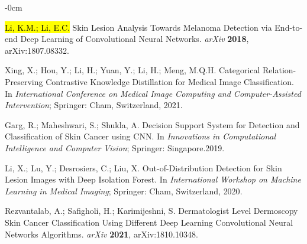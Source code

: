 \documentclass[sensors,article,accept,pdftex,moreauthors]{Definitions/mdpi}
\begin{document}
\begin{adjustwidth}{-\extralength}{0cm}




%

\begin{thebibliography}{999}

\hl{Li, K.M.; Li, E.C.} %
 Skin Lesion Analysis Towards Melanoma Detection via End-to-end Deep Learning of Convolutional Neural Networks. 
{\em arXiv } 
{\bf{2018}}, arXiv:1807.08332.

Xing, X.; Hou, Y.; Li, H.; Yuan, Y.; Li, H.; Meng, M.Q.H.
  Categorical Relation-Preserving Contrastive Knowledge Distillation for Medical Image Classification. 
In  \emph{International Conference on Medical Image Computing and Computer-Assisted Intervention}; Springer: Cham, Switzerland, 
{2021}.

Garg, R.; Maheshwari, S.; Shukla, A. Decision Support System for Detection and Classification of Skin Cancer using CNN. In \emph{Innovations in Computational Intelligence and Computer Vision}; Springer: Singapore.{2019}.

Li, X.; Lu, Y.; Desrosiers, C.; Liu, X. Out-of-Distribution Detection for Skin Lesion Images with Deep Isolation Forest. In \emph{International Workshop on Machine Learning in Medical Imaging}; Springer: Cham, Switzerland, 
{2020}.

Rezvantalab, A.; Safigholi, H.; Karimijeshni, S. Dermatologist Level Dermoscopy Skin Cancer Classification Using Different Deep Learning Convolutional Neural Networks Algorithms. 
{\em arXiv } 
{\bf 2021}, arXiv:1810.10348.


\end{thebibliography}
\end{adjustwidth}
\end{document}
